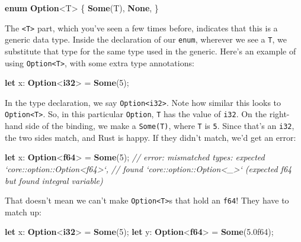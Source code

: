\documentclass[a4paper,]{book}
\newenvironment{Shaded}{\begin{snugshade}}{\end{snugshade}}
\newcommand{\KeywordTok}[1]{\textcolor[rgb]{0.13,0.29,0.53}{\textbf{{#1}}}}
\newcommand{\DecValTok}[1]{\textcolor[rgb]{0.00,0.00,0.81}{{#1}}}
\newcommand{\CommentTok}[1]{\textcolor[rgb]{0.56,0.35,0.01}{\textit{{#1}}}}
\newcommand{\NormalTok}[1]{{#1}}
\begin{document}
\begin{Shaded}
\begin{Highlighting}[]
\KeywordTok{enum} \KeywordTok{Option}\NormalTok{<T> \{}
    \KeywordTok{Some}\NormalTok{(T),}
    \KeywordTok{None}\NormalTok{,}
\NormalTok{\}}
\end{Highlighting}
\end{Shaded}

The \texttt{\textless{}T\textgreater{}} part, which you've seen a few
times before, indicates that this is a generic data type. Inside the
declaration of our \texttt{enum}, wherever we see a \texttt{T}, we
substitute that type for the same type used in the generic. Here's an
example of using \texttt{Option\textless{}T\textgreater{}}, with some
extra type annotations:

\begin{Shaded}
\begin{Highlighting}[]
\KeywordTok{let} \NormalTok{x: }\KeywordTok{Option}\NormalTok{<}\KeywordTok{i32}\NormalTok{> = }\KeywordTok{Some}\NormalTok{(}\DecValTok{5}\NormalTok{);}
\end{Highlighting}
\end{Shaded}

In the type declaration, we say
\texttt{Option\textless{}i32\textgreater{}}. Note how similar this looks
to \texttt{Option\textless{}T\textgreater{}}. So, in this particular
\texttt{Option}, \texttt{T} has the value of \texttt{i32}. On the
right-hand side of the binding, we make a \texttt{Some(T)}, where
\texttt{T} is \texttt{5}. Since that's an \texttt{i32}, the two sides
match, and Rust is happy. If they didn't match, we'd get an error:

\begin{Shaded}
\begin{Highlighting}[]
\KeywordTok{let} \NormalTok{x: }\KeywordTok{Option}\NormalTok{<}\KeywordTok{f64}\NormalTok{> = }\KeywordTok{Some}\NormalTok{(}\DecValTok{5}\NormalTok{);}
\CommentTok{// error: mismatched types: expected `core::option::Option<f64>`,}
\CommentTok{// found `core::option::Option<_>` (expected f64 but found integral variable)}
\end{Highlighting}
\end{Shaded}

That doesn't mean we can't make
\texttt{Option\textless{}T\textgreater{}}s that hold an \texttt{f64}!
They have to match up:

\begin{Shaded}
\begin{Highlighting}[]
\KeywordTok{let} \NormalTok{x: }\KeywordTok{Option}\NormalTok{<}\KeywordTok{i32}\NormalTok{> = }\KeywordTok{Some}\NormalTok{(}\DecValTok{5}\NormalTok{);}
\KeywordTok{let} \NormalTok{y: }\KeywordTok{Option}\NormalTok{<}\KeywordTok{f64}\NormalTok{> = }\KeywordTok{Some}\NormalTok{(}\DecValTok{5.0f64}\NormalTok{);}
\end{Highlighting}
\end{Shaded}
\end{document}
